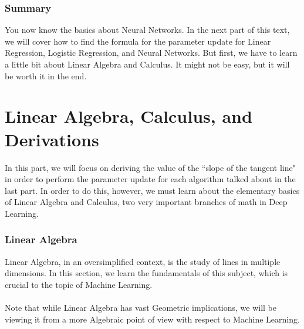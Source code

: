 \documentclass{article}
\begin{document}


\section{Summary}
You now know the basics about Neural Networks. In the next part of this text, we will cover how to find the formula for the parameter update for Linear Regression, Logistic Regression, and Neural Networks. But first, we have to learn a little bit about Linear Algebra and Calculus. It might not be easy, but it will be worth it in the end.

\clearpage
\part{Linear Algebra, Calculus, and Derivations}
\clearpage
In this part, we will focus on deriving the value of the ``slope of the tangent line" in order to perform the parameter update for each algorithm talked about in the last part. In order to do this, however, we must learn about the elementary basics of Linear Algebra and Calculus, two very important branches of math in Deep Learning. 

\section{Linear Algebra}
Linear Algebra, in an oversimplified context, is the study of lines in multiple dimensions. In this section, we learn the fundamentals of this subject, which is crucial to the topic of Machine Learning.
\\
\\
Note that while Linear Algebra has vast Geometric implications, we will be viewing it from a more Algebraic point of view with respect to Machine Learning.
\end{document}
